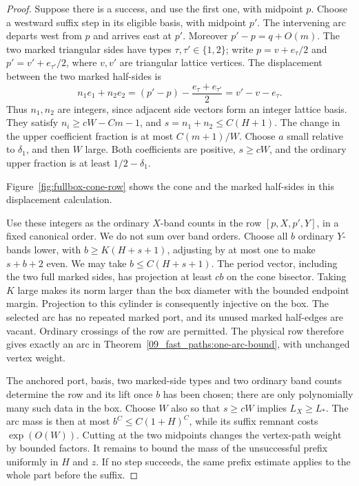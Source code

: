 \begin{proof}
Suppose there is a success, and use the first one, with midpoint \(p\).
Choose a westward suffix step in its eligible basis, with midpoint \(p'\).
The intervening arc departs west from \(p\) and arrives east at \(p'\).
Moreover \(p'-p=q+O(m)\). The two marked triangular sides have types
\(\tau,\tau'\in\{1,2\}\); write
\(p=v+e_\tau/2\) and \(p'=v'+e_{\tau'}/2\), where \(v,v'\) are
triangular lattice vertices. The displacement between the two marked
half-sides is
\begin{equation}\label{eq:fullbox-integer-row}
 n_1e_1+n_2e_2
   =(p'-p)-\frac{e_\tau+e_{\tau'}}2
   =v'-v-e_\tau.
\end{equation}
Thus \(n_1,n_2\) are integers, since adjacent side vectors form an
integer lattice basis. They satisfy
\(n_i\ge cW-Cm-1\), and \(s=n_1+n_2\le C(H+1)\).
The change in the upper coefficient fraction is at most
\(C(m+1)/W\). Choose \(a\) small relative to \(\delta_1\), and then
\(W\) large. Both coefficients are positive, \(s\ge cW\), and the
ordinary upper fraction is at least \(1/2-\delta_1\).

Figure~\ref{fig:fullbox-cone-row} shows the cone and the marked
half-sides in this displacement calculation.


Use these integers as the ordinary \(X\)-band counts in the row
\([p,X,p',Y]\), in a fixed canonical order. We do not sum over band
orders. Choose all \(b\) ordinary \(Y\)-bands lower, with
\(b\ge K(H+s+1)\), adjusting by at most one to make \(s+b+2\) even.
We may take \(b\le C(H+s+1)\). The period vector, including the two
full marked sides, has projection at least \(cb\) on the cone bisector.
Taking \(K\) large makes its norm larger than the box diameter with the
bounded endpoint margin. Projection to this cylinder is consequently
injective on the box. The selected arc has no repeated marked port, and
its unused marked half-edges are vacant. Ordinary crossings of the row
are permitted. The physical row therefore gives exactly an arc in
Theorem~\ref{09_fast_paths:one-arc-bound}, with unchanged vertex weight.

The anchored port, basis, two marked-side types and two ordinary band
counts determine the row and its lift once \(b\) has been chosen;
there are only polynomially many such data in the box. Choose \(W\)
also so that \(s\ge cW\) implies \(L_X\ge L_*\). The arc mass is then
at most \(b^C\le C(1+H)^C\), while its suffix remnant costs
\(\exp(O(W))\). Cutting at the two midpoints changes the vertex-path
weight by bounded factors. It remains to bound the mass of the
unsuccessful prefix uniformly in \(H\) and \(z\). If no step succeeds,
the same prefix estimate applies to the whole part before the suffix.


\end{proof}
